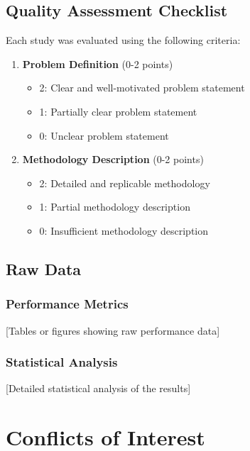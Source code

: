 \subsection{Quality Assessment Checklist}
\label{sec:quality_checklist}

Each study was evaluated using the following criteria:
\begin{enumerate}
    \item \textbf{Problem Definition} (0-2 points)
        \begin{itemize}
            \item 2: Clear and well-motivated problem statement
            \item 1: Partially clear problem statement
            \item 0: Unclear problem statement
        \end{itemize}
    \item \textbf{Methodology Description} (0-2 points)
        \begin{itemize}
            \item 2: Detailed and replicable methodology
            \item 1: Partial methodology description
            \item 0: Insufficient methodology description
        \end{itemize}
\end{enumerate}

\subsection{Raw Data}
\label{sec:raw_data}

\subsubsection{Performance Metrics}
[Tables or figures showing raw performance data]

\subsubsection{Statistical Analysis}
[Detailed statistical analysis of the results]

\section{Conflicts of Interest}
\label{sec:conflicts}

